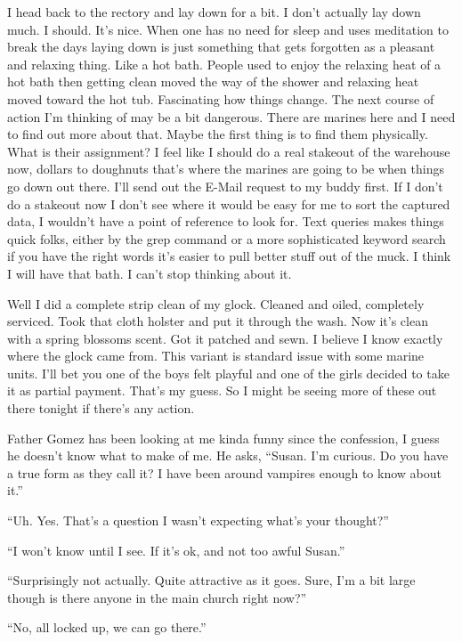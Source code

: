 I head back to the rectory and lay down for a bit. I don't actually lay down much. I should. It's nice. When one has no need for sleep and uses meditation to break the days laying down is just something that gets forgotten as a pleasant and relaxing thing. Like a hot bath. People used to enjoy the relaxing heat of a hot bath then getting clean moved the way of the shower and relaxing heat moved toward the hot tub. Fascinating how things change. The next course of action I'm thinking of may be a bit dangerous. There are marines here and I need to find out more about that. Maybe the first thing is to find them physically. What is their assignment? I feel like I should do a real stakeout of the warehouse now, dollars to doughnuts that's where the marines are going to be when things go down out there. I'll send out the E-Mail request to my buddy first. If I don't do a stakeout now I don't see where it would be easy for me to sort the captured data, I wouldn't have a point of reference to look for. Text queries makes things quick folks, either by the grep command or a more sophisticated keyword search if you have the right words it's easier to pull better stuff out of the muck. I think I will have that bath. I can't stop thinking about it.

Well I did a complete strip clean of my glock. Cleaned and oiled, completely serviced. Took that cloth holster and put it through the wash. Now it's clean with a spring blossoms scent. Got it patched and sewn. I believe I know exactly where the glock came from. This variant is standard issue with some marine units. I'll bet you one of the boys felt playful and one of the girls decided to take it as partial payment. That's my guess. So I might be seeing more of these out there tonight if there's any action.

Father Gomez has been looking at me kinda funny since the confession, I guess he doesn't know what to make of me.
He asks, ``Susan. I'm curious. Do you have a true form as they call it? I have been around vampires enough to know about it.''

``Uh. Yes. That's a question I wasn't expecting what's your thought?''

``I won't know until I see. If it's ok, and not too awful Susan.''

``Surprisingly not actually. Quite attractive as it goes. Sure, I'm a bit large though is there anyone in the main church right now?''

``No, all locked up, we can go there.''

